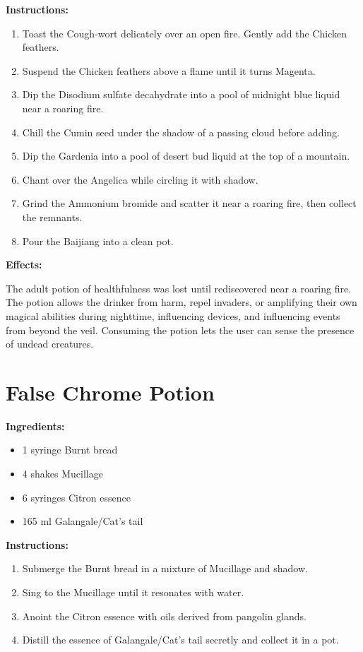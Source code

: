 \documentclass{article}
\begin{document}
\textbf{Instructions:}

\begin{enumerate}
  \item Toast the Cough-wort delicately over an open fire. Gently add the Chicken feathers.
  \item Suspend the Chicken feathers above a flame until it turns Magenta.
  \item Dip the Disodium sulfate decahydrate into a pool of midnight blue liquid near a roaring fire.
  \item Chill the Cumin seed under the shadow of a passing cloud before adding.
  \item Dip the Gardenia into a pool of desert bud liquid at the top of a mountain.
  \item Chant over the Angelica while circling it with shadow.
  \item Grind the Ammonium bromide and scatter it near a roaring fire, then collect the remnants.
  \item Pour the Baijiang into a clean pot.
\end{enumerate}

\textbf{Effects:}

The adult potion of healthfulness was lost until rediscovered near a roaring fire. The potion allows the drinker from harm, repel invaders, or amplifying their own magical abilities during nighttime, influencing devices, and influencing events from beyond the veil. Consuming the potion lets the user can sense the presence of undead creatures.

\newpage
\section*{False Chrome Potion}

\textbf{Ingredients:}

\begin{itemize}
  \item 1 syringe Burnt bread
  \item 4 shakes Mucillage
  \item 6 syringes Citron essence
  \item 165 ml Galangale/Cat's tail
\end{itemize}

\textbf{Instructions:}

\begin{enumerate}
  \item Submerge the Burnt bread in a mixture of Mucillage and shadow.
  \item Sing to the Mucillage until it resonates with water.
  \item Anoint the Citron essence with oils derived from pangolin glands.
  \item Distill the essence of Galangale/Cat's tail secretly and collect it in a pot.
\end{enumerate}
\end{document}
